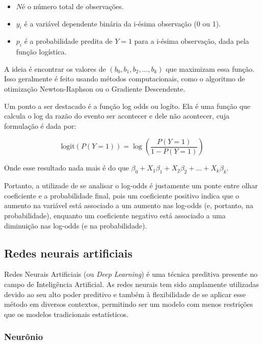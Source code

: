 \begin{itemize}
  \item  $N$é o número total de observações.
  \item  $y_i$ é a variável dependente binária da i-ésima observação (0 ou 1).
  \item $p_i$ é a probabilidade predita de $Y=1$ para a i-ésima observação, dada pela função logística.
\end{itemize}

A ideia é encontrar os valores de $(b_0, b_1, b_2, ..., b_k)$ que maximizam essa função. Isso geralmente é feito usando métodos computacionais, 
como o algoritmo de otimização Newton-Raphson ou o Gradiente Descendente.

Um ponto a ser destacado é a função log odds ou logíto. Ela é uma função que calcula o log da 
razão do evento ser acontecer e dele não acontecer, cuja formulação é dada por:

\begin{equation}
  \text{logit}(P(Y=1)) = \log \left( \frac{P(Y=1)}{1 - P(Y=1)} \right)
\end{equation}

Onde esse resultado nada mais é do que $\beta_0 + X_{1}\beta_1 + X_{2}\beta_2 + \ldots +X_{k}\beta_k$. 

Portanto, a utilizade de se analisar o log-odds é justamente um ponte entre olhar coeficiente e a probabilidade final, 
pois um coeficiente positivo indica que o aumento na variável está associado a um aumento nas log-odds 
(e, portanto, na probabilidade), enquanto um coeficiente negativo está associado a uma diminuição nas log-odds (e na probabilidade).


\subsection{Redes neurais artificiais}

Redes Neurais Artificiais (ou \textit{Deep Learning}) é uma técnica preditiva presente no campo de Inteligência Artificial. As redes neurais tem sido amplamente utilizadas devido ao seu alto poder preditivo e também à flexibilidade de se aplicar esse método em diversos contextos, permitindo ser um modelo com menos restrições que os modelos tradicionais estatísticos.


\subsubsection{Neurônio}

